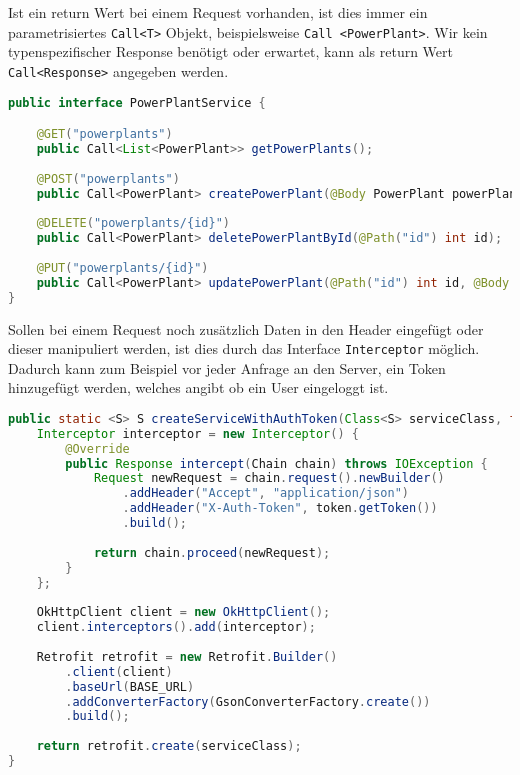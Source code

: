 Ist ein return Wert bei einem Request vorhanden, ist dies immer ein parametrisiertes \texttt{Call<T>} Objekt, beispielsweise \texttt{Call <PowerPlant>}. Wir kein typenspezifischer Response benötigt oder erwartet, kann als return Wert \texttt{Call<Response>} angegeben werden.
 
\begin{lstlisting}[language=java, caption={Auszug aus dem PowerPlantService},label={lst:retrofitPowerPlantService}, escapechar=|, numbers=none, frame=single]
public interface PowerPlantService {

	@GET("powerplants")
	public Call<List<PowerPlant>> getPowerPlants();
	
	@POST("powerplants")
	public Call<PowerPlant> createPowerPlant(@Body PowerPlant powerPlant);
	
	@DELETE("powerplants/{id}")
	public Call<PowerPlant> deletePowerPlantById(@Path("id") int id); |\label{line:path}|
	
	@PUT("powerplants/{id}")
	public Call<PowerPlant> updatePowerPlant(@Path("id") int id, @Body PowerPlant powerPlant); |\label{line:body}|
}
\end{lstlisting}

\newpage
Sollen bei einem Request noch zusätzlich Daten in den Header eingefügt oder dieser manipuliert werden, ist dies durch das Interface \texttt{Interceptor} möglich. Dadurch kann zum Beispiel vor jeder Anfrage an den Server, ein Token hinzugefügt werden, welches angibt ob ein User eingeloggt ist.

\begin{lstlisting}[language=java, caption={Hinzufügen des Tokens, für gültigen Login},label={lst:addToken}, escapechar=|, frame=single]
public static <S> S createServiceWithAuthToken(Class<S> serviceClass, final AuthToken token) {
	Interceptor interceptor = new Interceptor() {
		@Override
		public Response intercept(Chain chain) throws IOException {
			Request newRequest = chain.request().newBuilder()
				.addHeader("Accept", "application/json")
				.addHeader("X-Auth-Token", token.getToken())
				.build();
		
			return chain.proceed(newRequest);
		}
	};
		
	OkHttpClient client = new OkHttpClient();
	client.interceptors().add(interceptor);
		
	Retrofit retrofit = new Retrofit.Builder()
		.client(client)
		.baseUrl(BASE_URL)
		.addConverterFactory(GsonConverterFactory.create())
		.build();
	
	return retrofit.create(serviceClass);
}
\end{lstlisting}


